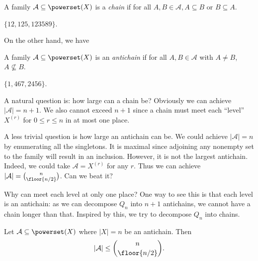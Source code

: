 \documentclass[a4paper]{article}
\begin{document}
\begin{definition}[chain]
  A family \(\mathcal A \subseteq \powerset (X)\) is a \emph{chain} if for all \(A, B \in \mathcal A, A \subseteq B \text{ or } B \subseteq A\).
\end{definition}

\begin{eg}
  \(\{12, 125, 123589\}\).
\end{eg}

On the other hand, we have

\begin{definition}[antichain]
  A family \(\mathcal A \subseteq \powerset (X)\) is an \emph{antichain} if for all \(A, B \in \mathcal A\) with \(A \neq B\), \(A \nsubseteq B\).
\end{definition}

\begin{eg}
  \(\{1, 467, 2456\}\).
\end{eg}

A natural question is: how large can a chain be? Obviously we can achieve \(|\mathcal A| = n + 1\). We also cannot exceed \(n + 1\) since a chain must meet each ``level'' \(X^{(r)}\) for \(0 \leq r \leq n\) in at most one place.

A less trivial question is how large an antichain can be. We could achieve \(|\mathcal A| = n\) by enumerating all the singletons. It is maximal since adjoining any nonempty set to the family will result in an inclusion. However, it is not the largest antichain. Indeed, we could take \(\mathcal A = X^{(r)}\) for any \(r\). Thus we can achieve \(|\mathcal A| = \binom{n}{\floor{n/2}}\). Can we beat it?

Why can meet each level at only one place? One way to see this is that each level is an antichain: as we can decompose \(Q_n\) into \(n + 1\) antichains, we cannot have a chain longer than that. Inspired by this, we try to decompose \(Q_n\) into chains.

\begin{theorem}
  Let \(\mathcal A \subseteq \powerset(X)\) where \(|X| = n\) be an antichain. Then
  \[
    |\mathcal A| \leq \binom{n}{\floor{n/2}}.
  \]
\end{theorem}
\end{document}
